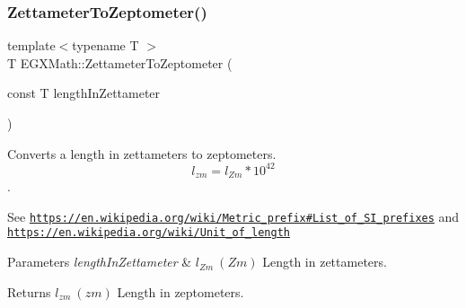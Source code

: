 \subsubsection{\texorpdfstring{Zettameter\+To\+Zeptometer()}{ZettameterToZeptometer()}}
{\footnotesize\ttfamily template$<$typename T $>$ \\
T E\+G\+X\+Math\+::\+Zettameter\+To\+Zeptometer (\begin{DoxyParamCaption}\item[{const T}]{length\+In\+Zettameter }\end{DoxyParamCaption})}



Converts a length in zettameters to zeptometers. \[ l_{zm}=l_{Zm} * 10^{42} \]. 

See \href{https://en.wikipedia.org/wiki/Metric_prefix#List_of_SI_prefixes}{\tt https\+://en.\+wikipedia.\+org/wiki/\+Metric\+\_\+prefix\#\+List\+\_\+of\+\_\+\+S\+I\+\_\+prefixes} and \href{https://en.wikipedia.org/wiki/Unit_of_length}{\tt https\+://en.\+wikipedia.\+org/wiki/\+Unit\+\_\+of\+\_\+length} 
\begin{DoxyParams}{Parameters}
{\em length\+In\+Zettameter} & $ l_{Zm}\ (Zm)$ Length in zettameters. \\
\hline
\end{DoxyParams}
\begin{DoxyReturn}{Returns}
$ l_{zm}\ (zm)$ Length in zeptometers. 
\end{DoxyReturn}
